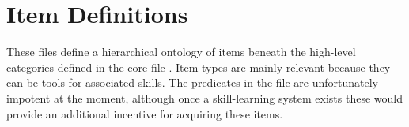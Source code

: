 \section{Item Definitions}

These files define a hierarchical ontology of items beneath the high-level categories defined in the core file .
%
Item types are mainly relevant because they can be tools for associated skills.
%
The  predicates in the  file are unfortunately impotent at the moment, although once a skill-learning system exists these would provide an additional incentive for acquiring these items. 



